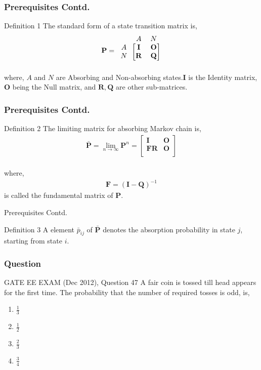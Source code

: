 \documentclass{beamer}
\renewcommand{\vec}[1]{\mathbf{#1}}
\let\vec\mathbf
\begin{document}
\begin{frame}
    \frametitle{Prerequisites Contd.}
     \begin{block}{Definition 1}
         The standard form of a state transition matrix is,
         \begin{align}
   \vec{P}=\begin{blockarray}{ccc}
&A & N \\
\begin{block}{c[cc]}
  A & \vec{I} & \vec{O}  \\
  N & \vec{R} & \vec{Q} \\
\end{block}
\end{blockarray}
\label{eq3}
\end{align}
where,
    $A$ and $N$ are Absorbing and Non-absorbing states.$\vec{I}$ is the Identity matrix, $\vec{O}$ being the Null matrix, and $\vec{R},\vec{Q}$ are other sub-matrices.\\
\end{block}
\end{frame}
\begin{frame}
    \frametitle{Prerequisites Contd.}
    \begin{block}{Definition 2}
      The limiting matrix for absorbing Markov chain is,
\begin{align}
    \vec{\bar P}= \lim_{n\to\infty} \vec P^{n} =\begin{bmatrix}
    \vec{I} & \vec{O}\\
    \vec{FR} & \vec{O}\\
    \end{bmatrix}
    \label{eq4}
\end{align}
\\where,
\begin{align}
    \vec{F}=(\vec{I}-\vec{Q})^{-1}
    \label{eq5}
\end{align}
is called the fundamental matrix of $\vec{P}$. \\
    \end{block}
\end{frame}
\begin{frame}{Prerequisites Contd.}
\begin{block}{Definition 3}
A element $\bar p_{ij}$ of $\vec{\bar P}$ denotes the absorption probability in state $j$, starting from state $i$.
\end{block}
\end{frame}
\begin{frame}
    \frametitle{Question}
    \begin{block}{GATE EE EXAM (Dec 2012), Question 47}
   A fair coin is tossed till head appears for the first time. The probability that the number of required tosses is odd, is, \\
\begin{enumerate}
    \item $\frac{1}{3}$
    \item $\frac{1}{2}$
    \item $\frac{2}{3}$
    \item $\frac{3}{4}$
\end{enumerate}
  \end{block}
\end{frame}
\end{document}
